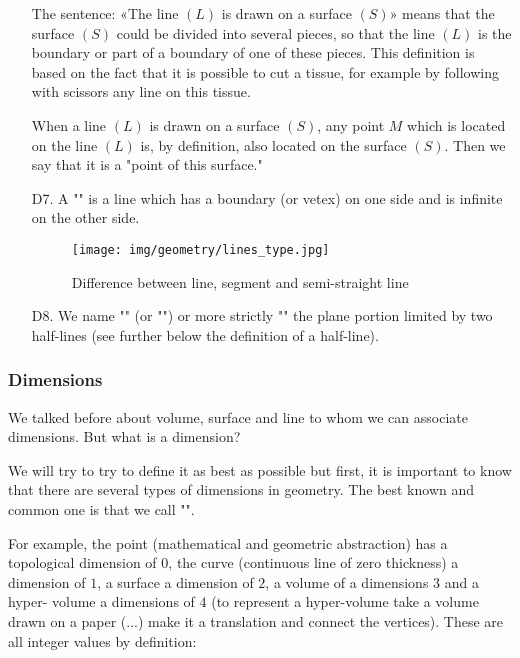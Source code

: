 \begin{enumerate}
	\begin{tcolorbox}[title=Remark,colframe=black,arc=10pt]
		The sentence: «The line $(L)$ is drawn on a surface $(S)$» means that the surface $(S)$ could be divided into several pieces, so that the line $(L)$ is the boundary or part of a boundary of one of these pieces. This definition is based on the fact that it is possible to cut a tissue, for example by following with scissors any line on this tissue.
	\end{tcolorbox}

When a line $(L)$ is drawn on a surface $(S)$, any point $M$ which is located on the line $(L)$ is, by definition, also located on the surface $(S)$. Then we say that it is a "point of this surface."

		\item[D7.] A "" is a line which has a boundary (or vetex) on one side and is infinite on the other side.
		
		\begin{figure}[H]
		\centering
		\texttt{[image: img/geometry/lines\_type.jpg]}
		\caption{Difference between line, segment and semi-straight line}
		\end{figure}
		
		\item[D8.] We name "" (or "") or more strictly "" the plane portion limited by two half-lines (see further below the definition of a half-line).
	\end{enumerate}
	
	\subsubsection{Dimensions}

We talked before about volume, surface and line to whom we can associate dimensions. But what is a dimension? 

We will try to try to define it as best as possible but first, it is important to know that there are several types of dimensions in geometry. The best known and common one is that we call "".

For example, the point (mathematical and geometric abstraction) has a topological dimension of $0$, the curve (continuous line of zero thickness) a dimension of $1$, a  surface a dimension of $2$, a volume of a dimensions $3$ and a hyper- volume a dimensions of $4$ (to represent a hyper-volume take a volume drawn on a paper (...) make it a translation and connect the vertices). These are all integer values by definition:

